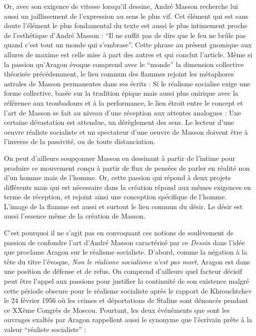 	Or, avec son exigence de vitesse lorsqu’il dessine, André Masson recherche lui aussi un jaillissement de l’expression au sens le plus vif. Cet élément qui est sans doute l’élément le plus fondamental du texte est aussi le plus intimement proche de l’esthétique d’André Masson : \enquote{Il ne suffit pas de dire que le feu ne brûle pas quand c’est tout un monde qui s’embrase}. Cette phrase au présent gnomique aux allures de maxime est celle mise à part des autres et qui conclut l’article. Même si la passion qu’Aragon évoque comprend avec le \enquote{monde} la dimension collective théorisée précédemment, le lieu commun des flammes rejoint les métaphores astrales de Masson permanentes dans ses écrits : Si le réalisme socialise exige une forme collective, basée sur la tradition épique mais aussi plus onirique avec la référence aux troubadours et à la performance, le lien étroit entre le concept et l’art de Masson se fait au niveau d’une réception aux attentes analogues : Une certaine dévastation est attendue, un dérèglement des sens. Le lecteur d’une oeuvre réaliste socialiste et un spectateur d’une oeuvre de Masson doivent être à l’inverse de la passivité, ou de toute distanciation. 

	On peut d’ailleurs soupçonner Masson en dessinant à partir de l’intime pour produire ce mouvement conçu à partir de flux de pensées de parler en réalité non d’un homme mais de l’homme. Or, cette passion qui répond à deux projets différents mais qui est nécessaire dans la création répond aux mêmes exigences en terme de réception, et rejoint ainsi une conception spécifique de l’homme. L’image de la flamme est aussi et surtout le lieu commun du désir. Le désir est aussi l’essence même de la création de Masson. 

C’est pourquoi il ne s’agit pas en convoquant ces notions de soulèvement de passion de confondre l’art d’André Masson caractérisé par ce \emph{Dessin} dans l’idée que proclame Aragon sur le réalisme socialiste. D’abord, comme la négation à la tête du titre l’évoque, \emph{Non le réalisme socialisme n’est pas mort}, Aragon est dans une position de défense et de refus. On comprend d’ailleurs quel facteur décisif peut être l’appel aux passions pour justifier la continuité de son existence malgré cette période obscure pour le réalisme socialiste après le rapport de Khrouchtchev le 24 février 1956 où les crimes et déportations de Staline sont dénoncés pendant ce XXème Congrès de Moscou. Pourtant, les deux événéments que sont les ouvrages exaltés par Aragon rappellent aussi le synonyme que l'écrivain prête à la valeur \enquote{réaliste socialiste} :  

